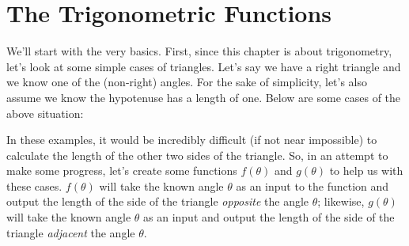 \documentclass[../book.tex]{subfiles}
\begin{document}
\section{The Trigonometric Functions}
\noindent We'll start with the very basics. First, since this chapter is about trigonometry, let's look at some simple cases of triangles. Let's say we have a right triangle and we know one of the (non-right) angles. For the sake of simplicity, let's also assume we know the hypotenuse has a length of one. Below are some cases of the above situation:
\begin{figure}[!ht]
    \centering
    \hspace{0.5cm}
    \hspace{0.5cm}
\end{figure}
In these examples, it would be incredibly difficult (if not near impossible) to calculate the length of the other two sides of the triangle. So, in an attempt to make some progress, let's create some functions $f(\theta)$ and $g(\theta)$ to help us with these cases. $f(\theta)$ will take the known angle $\theta$ as an input to the function and output the length of the side of the triangle \textit{opposite} the angle $\theta$; likewise, $g(\theta)$ will take the known angle $\theta$ as an input and output the length of the side of the triangle \textit{adjacent} the angle $\theta$.
\end{document}
